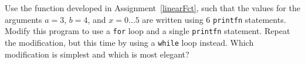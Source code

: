 \label{table} Use the function developed in Assignment~\ref{linearFct}, such that the values for the arguments $a=3$, $b=4$, and $x=0\ldots5$ are written using 6 \lstinline!printfn! statements. Modify this program to use a \lstinline!for! loop and a single \lstinline!printfn! statement. Repeat the modification, but this time by using a \lstinline!while! loop instead. Which modification is simplest and which is most elegant?

